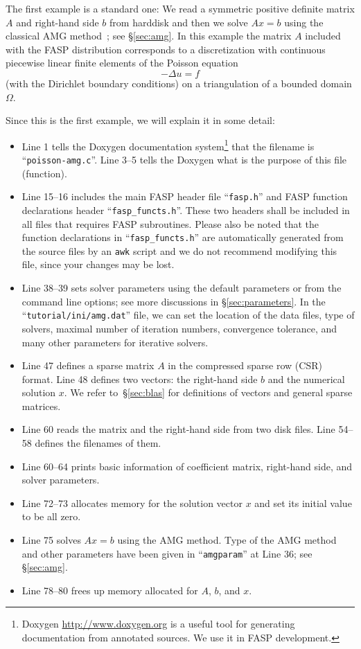 \documentclass[11pt]{memoir}
\begin{document}
The first example is a standard one: We read a symmetric
positive definite matrix $A$ and right-hand side $b$ from harddisk and then we solve
$Ax=b$ using the classical AMG
method~\cite{Brandt.BrandtMcCormick.1982uq,Ruge.RugeStuben.1985ij,Ruge.RugeStuben.1987bs};
see \S\ref{sec:amg}. In this example the matrix $A$ included with the
FASP distribution corresponds to a discretization with continuous
piecewise linear finite elements of the Poisson equation
$$-\Delta u = f$$ (with the Dirichlet boundary conditions) on a
triangulation of a bounded domain $\Omega$.
%

%
Since this is the first example, we will explain it in some detail:
\begin{itemize}
%
\item Line 1 tells the Doxygen documentation system\footnote{Doxygen \url{http://www.doxygen.org} is a useful tool for generating documentation from annotated sources. We use it in FASP development.} that the filename
  is ``\verb|poisson-amg.c|''. Line 3--5 tells the Doxygen what is the
  purpose of this file (function).
%
\item Line 15--16 includes the main FASP header file ``\verb|fasp.h|'' and
  FASP function declarations header ``\verb|fasp_functs.h|''. These two
  headers shall be included in all files that requires FASP
  subroutines. Please also be noted that the function declarations in
  ``\verb|fasp_functs.h|'' are automatically generated from the source files
  by an \verb|awk| script and we do not recommend modifying this file,
  since your changes may be lost. 
%
\item Line 38--39 sets solver parameters using the default parameters or
  from the command line options; see more discussions in
  \S\ref{sec:parameters}. In the ``\verb|tutorial/ini/amg.dat|'' file, we can
  set the location of the data files, type of solvers, maximal number
  of iteration numbers, convergence tolerance, and many other
  parameters for iterative solvers.
%
\item Line 47 defines a sparse matrix $A$ in the compressed sparse row
  (CSR) format. Line 48 defines two vectors: the right-hand side $b$
  and the numerical solution $x$. We refer to~\S\ref{sec:blas} for
  definitions of vectors and general sparse matrices.
%
\item Line 60 reads the matrix and the right-hand side from two disk
  files. Line 54--58 defines the filenames of them.
%
\item Line 60--64 prints basic information of coefficient matrix,
  right-hand side, and solver parameters.
%
\item Line 72--73 allocates memory for the solution vector $x$ and set
  its initial value to be all zero.
%
\item Line 75 solves $Ax=b$ using the AMG method. Type of the AMG
  method and other parameters have been given in ``\verb|amgparam|'' at Line
  36; see \S\ref{sec:amg}.
%
\item Line 78--80 frees up memory allocated for $A$, $b$, and $x$.
\end{itemize}
\end{document}
